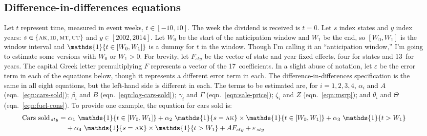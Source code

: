 \documentclass[11pt,letterpaper,oneside]{article}
\let\originalleft\left
\let\originalright\right
\renewcommand{\left}{\mathopen{}\mathclose\bgroup\originalleft}
\renewcommand{\right}{\aftergroup\egroup\originalright}
\newcommand{\msrp}{\textsc{msrp}}
\newcommand{\indicator}[1]{\mathds{1}\left\{#1\right\}}
\newcommand{\anticipation}{\indicator{t \in [W_0, W_1]}}
\newcommand{\isAlaska}{\indicator{s = \textsc{ak}}}
\newcommand{\postWindow}{\indicator{t > W_1}}
\newcommand{\ddEqn}[3]{%
\text{#1}_{\, sty} = & \  #2_1 \ \anticipation + #2_2 \ \isAlaska \times \anticipation + #2_3 \ \postWindow \\ \nonumber
&+ #2_4 \ \isAlaska \times \postWindow + #3 F_{ sty} + \varepsilon_{\, sty}
}
\newcommand{\ddEqnLog}[3]{%
\ln\left(\text{#1}_{\, sty}\right) = & \  #2_1 \ \anticipation + #2_2 \ \isAlaska \times \anticipation + #2_3 \ \postWindow \\ \nonumber
&+ #2_4 \ \isAlaska \times \postWindow + #3 F_{ sty} + \varepsilon_{\, sty}
}
\begin{document}
\begin{doublespacing}
\subsection{Difference-in-differences equations}
Let $t$ represent time, measured in event weeks, $t \in [-10, 10]$.
The week the dividend is received is $t=0$.
Let $s$ index states and $y$ index years: $s \in \{\textsc{ak}, \textsc{id},\textsc{mt},\textsc{ut} \}$ and $y \in [2002, 2014]$.
Let $W_0$ be the start of the anticipation window and $W_1$ be the end, so $[W_0, W_1]$ is the window interval and $\anticipation$ is a dummy for $t$ in the window.
Though I'm calling it an ``anticipation window,'' I'm going to estimate some versions with $W_0$ or $W_1 > 0$.
For brevity, let $F_{sty}$ be the vector of state and year fixed effects, four for states and 13~for years.
The capital Greek letter premultiplying $F$ represents a vector of the 17~coefficients.
In a slight abuse of notation, let $\varepsilon$ be the error term in each of the equations below, though it represents a different error term in each.
The difference\hyp{}in\hyp{}differences specification is the same in all eight equations, but the left\hyp{}hand side is different in each.
The terms to be estimated are, for $i = 1,2,3,4$,
$\alpha_i$ and $A$ (eqn.~\ref{eqn:cars-sold});
$\beta_i$ and $B$ (eqn.~\ref{eqn:log-cars-sold});
$\gamma_i$ and $\Gamma$ (eqn.~\ref{eqn:sale-price});
$\zeta_i$ and $Z$ (eqn.~\ref{eqn:msrp}); and
$\theta_i$ and $\Theta$ (eqn.~\ref{eqn:fuel-cons}).
To provide one example, the equation for cars sold is:
\begin{align}
    \label{eqn:cars-sold}
    \ddEqn{Cars sold}{\alpha}{A}
\end{align}


\end{doublespacing}
\end{document}
